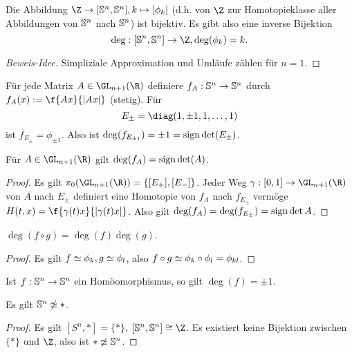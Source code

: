 \begin{st}
	Die Abbildung $\Z \to [\S^n, \S^n], k \mapsto [\phi_k]$ (d.h. von $\Z$ zur Homotopieklasse aller Abbildungen von $\S^n$ nach $\S^n$) ist bijektiv.
	Es gibt also eine inverse Bijektion
	\[
		\deg: [\S^n, \S^n] \to \Z,
		\deg(\phi_k) = k.
	\]
	\begin{proof}[Beweis-Idee]
		Simpliziale Approximation und Umläufe zählen für $n = 1$.
	\end{proof}
\end{st}

\begin{ex}
	Für jede Matrix $A \in \GL_{n+1}(\R)$ definiere $f_A: \S^n \to \S^n$ durch
	$f_A(x) := \f {Ax}{|Ax|}$ (stetig).
	Für
	\[
		E_\pm = \diag(1, \pm 1, 1, \dotsc, 1)
	\]
	ist $f_{E_\pm} = \phi_{\pm 1}$.
	Also ist $\deg(f_{E_{\pm 1}})  = \pm 1 = \sign \det (E_\pm)$.
\end{ex}

\begin{prop}
	Für $A \in \GL_{n+1} (\R)$ gilt $\deg(f_A) = \sign \det(A)$.
	\begin{proof}
		Es gilt $\pi_0(\GL_{n+1}(\R)) = \{ [E_+], [E_-] \}$.
		Jeder Weg $\gamma: [0,1] \to \GL_{n+1}(\R)$ von $A$ nach $E_\pm$ definiert eine Homotopie von $f_A$ nach $f_{E_\pm}$ vermöge $H(t, x) = \f {\gamma(t) x}{|\gamma(t) x |}$.
		Also gilt $\deg(f_A) = \deg(f_{E_\pm}) = \sign \det A$.
	\end{proof}
\end{prop}

\begin{kor}
	$\deg(f\circ g) = \deg(f) \deg(g)$.
	\begin{proof}
		Es gilt $f \homotopic \phi_k, g \homotopic \phi_l$, also $f \circ g \homotopic \phi_k \circ \phi_l = \phi_{kl}$.
	\end{proof}
\end{kor}

\begin{kor}
	Ist $f: \S^n \to \S^n$ ein Homöomorphismus, so gilt $\deg(f) = \pm 1$.
\end{kor}

\begin{kor} \label{sphere_non-contractible}
	Es gilt $\S^n \not\homotopic *$.
	\begin{proof}
		Es gilt $[S^n, *] = \{*\}$, $[\S^n, \S^n] \isomorphic \Z$.
		Es existiert keine Bijektion zwischen $\{*\}$ und $\Z$, also ist $* \not\homotopic \S^n$.
	\end{proof}
\end{kor}

